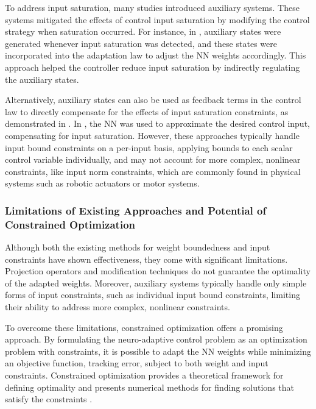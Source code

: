 \documentclass[journal]{IEEEtran}
\begin{document}
To address input saturation, many studies introduced auxiliary systems. 
These systems mitigated the effects of control input saturation by modifying the control strategy when saturation occurred. 
For instance, in \cite{Esfandiari:2014aa,Karason:1994aa,Esfandiari:2015aa}, auxiliary states were generated whenever input saturation was detected, and these states were incorporated into the adaptation law to adjust the NN weights accordingly. 
This approach helped the controller reduce input saturation by indirectly regulating the auxiliary states.

Alternatively, auxiliary states can also be used as feedback terms in the control law to directly compensate for the effects of input saturation constraints, as demonstrated in \cite{Arefinia:2020aa,He:2016aa,Peng:2020aa}. 
In \cite{Gao:2006aa}, the NN was used to approximate the desired control input, compensating for input saturation. 
However, these approaches typically handle input bound constraints on a per-input basis, \ie applying bounds to each scalar control variable individually, and may not account for more complex, nonlinear constraints, like input norm constraints, which are commonly found in physical systems such as robotic actuators or motor systems.

\hfill

\subsubsection{Limitations of Existing Approaches and Potential of Constrained Optimization}

Although both the existing methods for weight boundedness and input constraints have shown effectiveness, they come with significant limitations. 
Projection operators and modification techniques do not guarantee the optimality of the adapted weights. 
Moreover, auxiliary systems typically handle only simple forms of input constraints, such as individual input bound constraints, limiting their ability to address more complex, nonlinear constraints.

To overcome these limitations, constrained optimization offers a promising approach. 
By formulating the neuro-adaptive control problem as an optimization problem with constraints, it is possible to adapt the NN weights while minimizing an objective function, \eg tracking error, subject to both weight and input constraints. 
Constrained optimization provides a theoretical framework for defining optimality and presents numerical methods for finding solutions that satisfy the constraints \cite{Nocedal:2006aa}.
\end{document}
